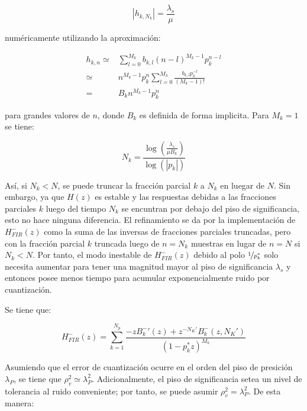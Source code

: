 \documentclass[conference]{IEEEtran}
\begin{document}
\begin{equation}
    |h_{k,N_k}| = \frac{\lambda_s}{\mu}
\end{equation}

numéricamente utilizando la aproximación:

\begin{align}
    h_{k,n} \simeq & \sum_{l=0}^{M_k}{b_{k,l}(n-l)^{M_k-1} p_k^{n-l}}\\
            \simeq & n^{M_k-1} p_k^{n} \sum_{l=0}^{M_k}{\frac{b_{k,l}p_k^{-l}}{(M_k-1)!}}\\
            = & B_k n^{M_k-1} p_k^{n}
\end{align}

para grandes valores de \(n\), donde \(B_k\) es definida de forma implicita. Para \(M_k=1\) se tiene:

\begin{equation}
    N_k = \frac{\log \left( \frac{\lambda_s}{\mu B_k}\right)}{\log (|p_k|)}
    \label{eq:73}
\end{equation}

Así, si \(N_k < N\), se puede truncar la fracción parcial \(k\) a \(N_k\) en luegar de \(N\). Sin embargo, ya que \(H(z)\) es estable y las respuestas debidas a las fracciones parciales \(k\) luego del tiempo \(N_k\) se encuntran por debajo del piso de significancia, esto no hace ninguna diferencia. El refinamiento se da por la implementación de \(H_{FIR}^{ -}(z)\)  como la suma de las inversas de fracciones parciales truncadas, pero con la fracción parcial \(k\) truncada luego de \(n=N_k\) muestras en lugar de \(n=N\) si \(N_k < N\). Por tanto, el modo inestable de \(H_{FIR}^{ -}(z)\) debido al polo \(\nicefrac{1}{p_k^{*}}\) solo necesita aumentar para tener una magnitud mayor al piso de significancia \(\lambda_s\) y entonces posee menos tiempo para acumular exponencialmente ruido por cuantización.

Se tiene que:

\begin{equation}
    H_{FIR}^{-}(z) = \sum_{k=1}^{N_p}{\frac{-z B_k^{-}'(z) + z^{-N_K'} B_k^{-}(z,N_K')}{(1-p_k^{*}z)^{M_k}}}
\end{equation}

Asumiendo que el error de cuantización ocurre en el orden del piso de presición \(\lambda_P\), se tiene que \(\rho^2_v \simeq \lambda_P^2\). Adicionalmente, el piso de significancia setea un nivel de tolerancia al ruido conveniente; por tanto, se puede asumir \(\rho^2_v = \lambda_P^2\). De esta manera:
\end{document}
